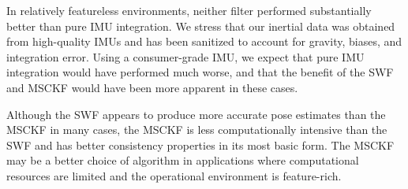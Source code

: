 \documentclass[letterpaper, 10 pt, conference]{ieeeconf}  %
\begin{document}
In relatively featureless environments, neither filter performed substantially better than pure IMU integration.
We stress that our inertial data was obtained from high-quality IMUs and has been sanitized to account for gravity, biases, and integration error.
Using a consumer-grade IMU, we expect that pure IMU integration would have performed much worse, and that the benefit of the SWF and MSCKF would have been more apparent in these cases.

Although the SWF appears to produce more accurate pose estimates than the MSCKF in many cases, the MSCKF is less computationally intensive than the SWF and has better consistency properties in its most basic form.
The MSCKF may be a better choice of algorithm in applications where computational resources are limited and the operational environment is feature-rich.


\def\url#1{} %


\end{document}
